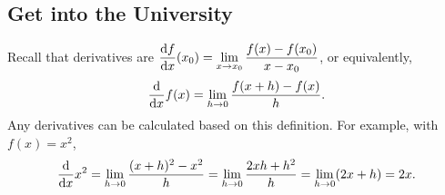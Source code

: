 \documentclass[11pt,pdfa,lastpage]{MishoNote}
\newif\ifBasicForm\BasicFormtrue
\begin{document}
\ifBasicForm\else\pagebreak\fi

\subsection{Get into the University}
Recall that derivatives are 
$\displaystyle\diff{f}{x}(x_0)=\lim_{x\to x_0}\frac{f(x)-f(x_0)}{x-x_0}$, or equivalently,
\begin{equation}
\diff{}{x}f(x)=\lim_{h\to 0}\frac{f(x+h)-f(x)}{h}.\label{eq:diff}
\end{equation}
Any derivatives can be calculated based on this definition. For example, with $f(x)=x^2$,
\begin{equation}
  \diff{}{x}x^2=\lim_{h\to 0}\frac{(x+h)^2-x^2}{h}=\lim_{h\to 0}\frac{2xh+h^2}{h}=\lim_{h\to 0}(2x+h)=2x.
  \label{eq:diffdefex}
\end{equation}

\vspace{.1em}
\end{document}
